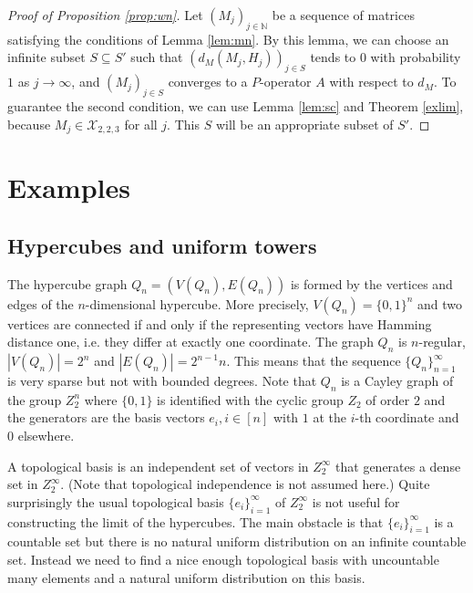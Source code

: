 \documentclass[a4wider]{amsart}
\theoremstyle{definitionbreak}\newtheorem{D}[theorem]{Definition}
\theoremstyle{definitionbreak}\newtheorem*{D*}{Definition}
\begin{document}
 

\begin{proof}[Proof of Proposition \ref{prop:wn}] Let $(M_j)_{j\in \mathbb N}$ be a sequence of matrices satisfying the conditions of Lemma \ref{lem:mn}. By this lemma, we can choose an infinite subset $S\subseteq S'$ such that $(d_M(M_j, H_j))_{j\in S}$ tends to $0$ with probability $1$ as $j\rightarrow\infty$, and $(M_j)_{j\in S}$ converges to a $P$-operator $A$ with respect to $d_M$. To guarantee the second condition, we can use Lemma \ref{lem:sc} and Theorem \ref{exlim}, because $M_j\in \mathcal X_{2,2,3}$ for all $j$. This $S$ will be an appropriate subset of $S'$.
\end{proof}

\section{Examples}\label{chapex}

\subsection{Hypercubes and uniform towers}

The hypercube graph $Q_n=(V(Q_n),E(Q_n))$ is formed by the vertices and edges of the $n$-dimensional hypercube. More precisely, $V(Q_n)=\{0,1\}^n$ and two vertices are connected if and only if the representing vectors have Hamming distance one, i.e. they differ at exactly one coordinate. The graph $Q_n$ is $n$-regular, $|V(Q_n)|=2^n$ and $|E(Q_n)|=2^{n-1}n$. This means that  the sequence $\{Q_n\}_{n=1}^\infty$ is very sparse but not with bounded degrees. 
Note that $Q_n$ is a Cayley graph of the group $Z_2^n$ where $\{0,1\}$ is identified with the cyclic group $Z_2$ of order $2$ and the generators are the basis vectors $e_i, i\in [n]$ with $1$ at the $i$-th coordinate and $0$ elsewhere. 


A topological basis is an independent set of vectors in $Z_2^\infty$ that generates a dense set in $Z_2^\infty$. (Note that topological independence is not assumed here.) Quite surprisingly the usual topological basis $\{e_i\}_{i=1}^\infty$ of $Z_2^\infty$ is not useful for constructing the limit of the hypercubes. The main obstacle is that $\{e_i\}_{i=1}^\infty$ is a countable set but there is no natural uniform distribution on an infinite countable set. Instead we need to find a nice enough topological basis with uncountable many elements and a natural uniform distribution on this basis.
\end{document}

